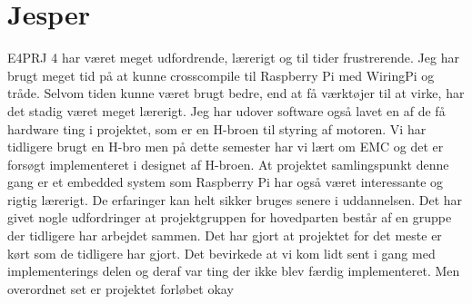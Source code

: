 \section{Jesper} 

E4PRJ 4 har været meget udfordrende, lærerigt og til tider frustrerende. Jeg har brugt meget tid på at kunne crosscompile til Raspberry Pi med WiringPi og tråde. 
Selvom tiden kunne været brugt bedre, end at få værktøjer til at virke, har det stadig været meget lærerigt. 
Jeg har udover software også lavet en af de få hardware ting i projektet, som er en H-broen til styring af motoren. 
Vi har tidligere brugt en H-bro men på dette semester har vi lært om EMC og det er forsøgt implementeret i designet af H-broen.
At projektet samlingspunkt denne gang er et embedded system som Raspberry Pi har også været interessante og rigtig lærerigt. 
De erfaringer kan helt sikker bruges senere i uddannelsen. \newline
Det har givet nogle udfordringer at projektgruppen for hovedparten består af en gruppe der tidligere har arbejdet sammen. 
Det har gjort at projektet for det meste er kørt som de tidligere har gjort. 
Det bevirkede at vi kom lidt sent i gang med implementerings delen og deraf var ting der ikke blev færdig implementeret. 
Men overordnet set er projektet forløbet okay
